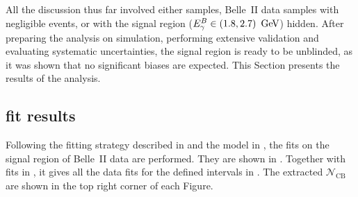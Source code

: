 All the discussion thus far involved either \MC samples, Belle~II data samples with negligible \BtoXsgamma events,
or with the signal region (${E^B_{\gamma}}\in(1.8,2.7)~\mathrm{\,Ge\kern -0.1em V}$) hidden.
After preparing the analysis on simulation, performing extensive validation and evaluating systematic uncertainties, 
the signal region is ready to be unblinded, as it was shown that no significant biases are expected.
This Section presents the results of the analysis.

\subsection{\texorpdfstring{\Mbc}{Mbc} fit results}\label{sec:mbc_fit_results}

Following the \Mbc fitting strategy described in  and the model in ,
the fits on the signal region of Belle~II data are performed.
They are shown in .
Together with fits in , it gives all the data fits for the defined \EB intervals in .
The extracted $\mathcal{N}_{\mathrm{CB}}$ are shown in the top right corner of each Figure.
